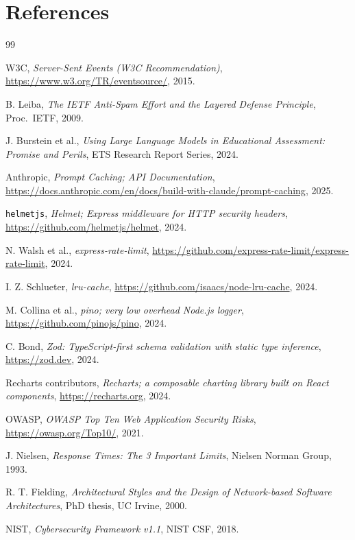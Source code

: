 \section*{References}
\label{sec:refs}

\begin{thebibliography}{99}

    W3C, \emph{Server-Sent Events (W3C Recommendation)},
    \url{https://www.w3.org/TR/eventsource/}, 2015.

    B. Leiba, \emph{The IETF Anti-Spam Effort and the Layered Defense Principle},
    Proc.\ IETF, 2009.

    J. Burstein et al., \emph{Using Large Language Models in Educational
    Assessment: Promise and Perils}, ETS Research Report Series, 2024.

    Anthropic, \emph{Prompt Caching; API Documentation},
    \url{https://docs.anthropic.com/en/docs/build-with-claude/prompt-caching}, 2025.

    \texttt{helmetjs}, \emph{Helmet; Express middleware for HTTP security
    headers}, \url{https://github.com/helmetjs/helmet}, 2024.

    N. Walsh et al., \emph{express-rate-limit},
    \url{https://github.com/express-rate-limit/express-rate-limit}, 2024.

    I. Z. Schlueter, \emph{lru-cache},
    \url{https://github.com/isaacs/node-lru-cache}, 2024.

    M. Collina et al., \emph{pino; very low overhead Node.js logger},
    \url{https://github.com/pinojs/pino}, 2024.

    C. Bond, \emph{Zod: TypeScript-first schema validation with static
    type inference}, \url{https://zod.dev}, 2024.

    Recharts contributors, \emph{Recharts; a composable charting
    library built on React components},
    \url{https://recharts.org}, 2024.

    OWASP, \emph{OWASP Top Ten Web Application Security Risks},
    \url{https://owasp.org/Top10/}, 2021.

    J. Nielsen, \emph{Response Times: The 3 Important Limits},
    Nielsen Norman Group, 1993.

    R. T. Fielding, \emph{Architectural Styles and the Design of
    Network-based Software Architectures}, PhD thesis, UC Irvine, 2000.

    NIST, \emph{Cybersecurity Framework v1.1},
    NIST CSF, 2018.

\end{thebibliography}
